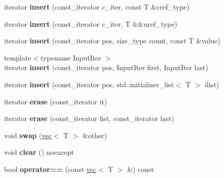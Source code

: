 \begin{DoxyCompactItemize}
\item 
\mbox{\label{classsc2d_1_1vec_add0f30278a01f084d3f297af00998b79}} 
iterator {\bfseries insert} (const\+\_\+iterator c\+\_\+iter, const T \&cref\+\_\+type)
\item 
\mbox{\label{classsc2d_1_1vec_a4b9d0592341fc6a955d6b80ec68ad10c}} 
iterator {\bfseries insert} (const\+\_\+iterator c\+\_\+iter, T \&\&uref\+\_\+type)
\item 
\mbox{\label{classsc2d_1_1vec_ac728f5ada6a294f72798c90e0029353a}} 
iterator {\bfseries insert} (const\+\_\+iterator pos, size\+\_\+type count, const T \&value)
\item 
\mbox{\label{classsc2d_1_1vec_ae4bbd60812916bd3c75e227143a28e55}} 
{\footnotesize template$<$typename Input\+Iter $>$ }\\iterator {\bfseries insert} (const\+\_\+iterator pos, Input\+Iter first, Input\+Iter last)
\item 
\mbox{\label{classsc2d_1_1vec_a07f3f0153a60827b03a80c491788a665}} 
iterator {\bfseries insert} (const\+\_\+iterator pos, std\+::initializer\+\_\+list$<$ T $>$ ilist)
\item 
\mbox{\label{classsc2d_1_1vec_a174295463d9a1491a1e9aeb3802c5ffc}} 
iterator {\bfseries erase} (const\+\_\+iterator it)
\item 
\mbox{\label{classsc2d_1_1vec_a73565575f5957283b9208383800d0adb}} 
iterator {\bfseries erase} (const\+\_\+iterator fist, const\+\_\+iterator last)
\item 
\mbox{\label{classsc2d_1_1vec_a12409b21d101c2238fcb1b9230d5c793}} 
void {\bfseries swap} (\hyperlink{classsc2d_1_1vec}{vec}$<$ T $>$ \&other)
\item 
\mbox{\label{classsc2d_1_1vec_a3b51edf6156943d1b639edd6d450d923}} 
void {\bfseries clear} () noexcept
\item 
\mbox{\label{classsc2d_1_1vec_a555f4c2aa083197f3b69301f1c2f34d1}} 
bool {\bfseries operator==} (const \hyperlink{classsc2d_1_1vec}{vec}$<$ T $>$ \&) const

\end{DoxyCompactItemize}

